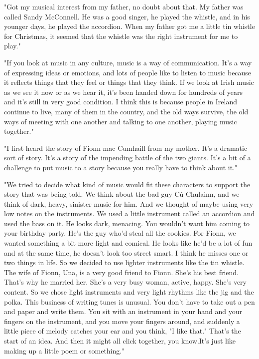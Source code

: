 "Got my musical interest from my father, no doubt about that. My father was called Sandy McConnell. He was a good singer, he played the whistle, and in his younger days, he played the accordion. When my father got me a little tin whistle for Christmas, it seemed that the whistle was the right instrument for me to play."

"If you look at music in any culture, music is a way of communication. It's a way of expressing ideas or emotions, and lots of people like to listen to music because it reflects things that they feel or things that they think. If we look at Irish music as we see it now or as we hear it, it's been handed down for hundreds of years and it's still in very good condition. I think this is because people in Ireland continue to live, many of them in the country, and the old ways survive, the old ways of meeting with one another and talking to one another, playing music together."

"I first heard the story of Fionn mac Cumhaill from my mother. It's a dramatic sort of story. It's a story of the impending battle of the two giants. It's a bit of a challenge to put music to a story because you really have to think about it."

"We tried to decide what kind of music would fit these characters to support the story that was being told. We think about the bad guy Cú Chulainn, and we think of dark, heavy, sinister music for him. And we thought of maybe using very low notes on the instruments. We used a little instrument called an accordion and used the bass on it. He looks dark, menacing. You wouldn't want him coming to your birthday party. He's the guy who'd steal all the cookies. For Fionn, we wanted something a bit more light and comical. He looks like he'd be a lot of fun and at the same time, he doesn't look too street smart. I think he misses one or two things in life. So we decided to use lighter instruments like the tin whistle. The wife of Fionn, Una, is a very good friend to Fionn. She's his best friend. That's why he married her. She's a very busy woman, active, happy. She's very content. So we chose light instruments and very light rhythms like the jig and the polka. This business of writing tunes is unusual. You don't have to take out a pen and paper and write them. You sit with an instrument in your hand and your fingers on the instrument, and you move your fingers around, and suddenly a little piece of melody catches your ear and you think, "I like that." That's the start of an idea. And then it might all click together, you know.It's just like making up a little poem or something."

